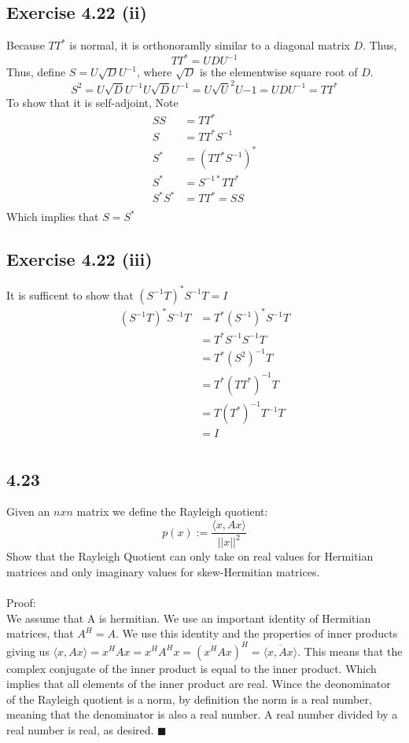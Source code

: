 \documentclass[letterpaper,12pt]{article}
\theoremstyle{definition}
\begin{document}
\subsection*{Exercise 4.22 (ii)}
Because $TT^*$ is normal, it is orthonoramlly similar to a diagonal matrix $D$. Thus, 
\[ TT^* = UDU^{-1} \]
Thus, define $S = U\sqrt{D}U^{-1}$, where $\sqrt{D}$ is the elementwise square root of $D$.\\
\[ S^2 = U\sqrt{D}U^{-1}U\sqrt{D}U^{-1} = U\sqrt{U}^2U{-1} = UDU^{-1} = TT^*\]
To show that it is self-adjoint, Note 
\begin{align*}
 SS &= TT^*\\
 S &= TT^*S^{-1}\\
 S^* &= (TT^*S^{-1})^*\\
 S^* &= S^{-1*}TT^*\\
 S^*S^* &= TT^* = SS\\
 \end{align*}
 Which implies that $S=S^*$
\subsection*{Exercise 4.22 (iii)}
It is sufficent to show that $(S^{-1}T)^*S^{-1}T = I$
\begin{align*} 
(S^{-1}T)^*S^{-1}T &= T^*(S^{-1})^*S^{-1}T\\
&= T^*S^{-1}S^{-1}T\\
&= T^*(S^2)^{-1}T\\
&= T^*(TT^*)^{-1}T\\
&= T(T^*)^{-1}T^{-1}T\\
&= I\\
\end{align*}




\subsection*{4.23}



Given an $nxn$ matrix we define the Rayleigh quotient:\\
\[p(x) := \frac{\langle x, Ax \rangle}{||x||^2}\]
Show that the Rayleigh Quotient can only take on real values for Hermitian matrices and only imaginary values for skew-Hermitian matrices.\\
\\
Proof:\\
We assume that A is hermitian. We use an important identity of Hermitian matrices, that $A^H=A$. We use this identity and the properties of inner products giving us $\langle x, Ax\rangle = x^HAx = x^HA^Hx = (x^HAx)^H  = \overline{\langle x,Ax\rangle}$. This means that the complex conjugate of the inner product is equal to the inner product. Which implies that all elements of the inner product are real. Wince the deonominator of the Rayleigh quotient is a norm, by definition the norm is a real number, meaning that the denominator is also a real number. A real number divided by a real number is real, as desired. \hfill $\blacksquare$\\
\end{document}
